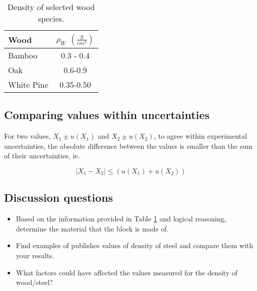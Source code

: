 \begin{table}[ht]
    \centering
    \begin{tabular}{|l|c|}
    \hline
        \textbf{Wood} & $\rho_W$ $(\frac{g}{cm^3})$  \\
        \hline
         Bamboo& 0.3 - 0.4\\
         Oak& 0.6-0.9 \\
         White Pine& 0.35-0.50\\
         \hline
    \end{tabular}
    \caption{Density of selected wood species.}
    \label{table:wood}
\end{table}

\subsection{Comparing values within uncertainties}
For two values, $X_1 \pm u(X_1)$ and $X_2\pm u(X_2)$, to agree within experimental uncertainties, the absolute difference between the values is smaller than the sum of their uncertainties, ie.

\begin{equation}
\label{eq:unc_agreement}
|X_1-X_2|\leq(u(X_1)+u(X_2))
\end{equation}

\subsection{Discussion questions}
\begin{itemize}
\item
Based on the information provided in Table \ref{table:wood} and logical reasoning, determine the material that the block is made of. 
\item
Find examples of publishes values of density of steel and compare them with your results.
\item
What factors could have affected the values measured for the density of wood/steel?

\end{itemize}
